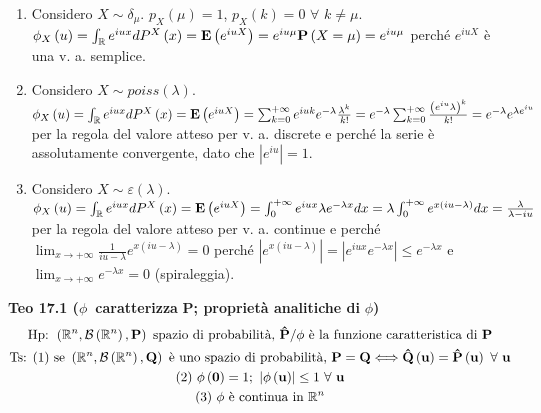 \documentclass{article}
\begin{document}
\begin{enumerate}
\item Considero $X\sim \delta _{\mu }$. $p_{X}\left( \mu \right) =1$, $%
p_{X}\left( k\right) =0$ $\forall $ $k\neq \mu $. $\phi _{X}\left( u\right)
=\int_{%
\mathbb{R}
}e^{iux}dP^{X}\left( x\right) =\mathbf{E}\left( e^{iuX}\right) =e^{iu\mu }%
\mathbf{P}\left( X=\mu \right) =e^{iu\mu }$ perch\'{e} $e^{iuX}$ \`{e} una
v. a. semplice.

\item Considero $X\sim poiss\left( \lambda \right) $. $\phi _{X}\left(
u\right) =\int_{%
\mathbb{R}
}e^{iux}dP^{X}\left( x\right) =\mathbf{E}\left( e^{iuX}\right)
=\sum_{k=0}^{+\infty }e^{iuk}e^{-\lambda }\frac{\lambda ^{k}}{k!}%
=e^{-\lambda }\sum_{k=0}^{+\infty }\frac{\left( e^{iu}\lambda \right) ^{k}}{%
k!}=e^{-\lambda }e^{\lambda e^{iu}}$ per la regola del valore atteso per v.
a. discrete e perch\'{e} la serie \`{e} assolutamente convergente, dato che $%
\left\vert e^{iu}\right\vert =1$.

\item Considero $X\sim \varepsilon \left( \lambda \right) $. $\phi
_{X}\left( u\right) =\int_{%
\mathbb{R}
}e^{iux}dP^{X}\left( x\right) =\mathbf{E}\left( e^{iuX}\right)
=\int_{0}^{+\infty }e^{iux}\lambda e^{-\lambda x}dx=\lambda
\int_{0}^{+\infty }e^{x\left( iu-\lambda \right) }dx=\frac{\lambda }{\lambda
-iu}$ per la regola del valore atteso per v. a. continue e perch\'{e} $%
\lim_{x\rightarrow +\infty }\frac{1}{iu-\lambda }e^{x\left( iu-\lambda
\right) }=0$ perch\'{e} $\left\vert e^{x\left( iu-\lambda \right)
}\right\vert =\left\vert e^{iux}e^{-\lambda x}\right\vert \leq e^{-\lambda
x} $ e $\lim_{x\rightarrow +\infty }e^{-\lambda x}=0$ (spiraleggia).
\end{enumerate}

\textbf{Teo 17.1 (}$\phi $\textbf{\ caratterizza }$\mathbf{P}$\textbf{;
propriet\`{a} analitiche di }$\phi $\textbf{)}%
\begin{gather*}
\text{Hp: }\left( 
\mathbb{R}
^{n},\mathcal{B}\left( 
\mathbb{R}
^{n}\right) ,\mathbf{P}\right) \text{ spazio di probabilit\`{a}, }\mathbf{%
\hat{P}}/\phi \text{ \`{e} la funzione caratteristica di }\mathbf{P} \\
\text{Ts: (1) se }\left( 
\mathbb{R}
^{n},\mathcal{B}\left( 
\mathbb{R}
^{n}\right) ,\mathbf{Q}\right) \text{ \`{e} uno spazio di probabilit\`{a}, }%
\mathbf{P=Q\Longleftrightarrow \hat{Q}}\left( \mathbf{u}\right) =\mathbf{%
\hat{P}}\left( \mathbf{u}\right) \text{ }\forall \text{ }\mathbf{u} \\
\text{(2) }\phi \left( \mathbf{0}\right) =1\text{; }\left\vert \phi \left( 
\mathbf{u}\right) \right\vert \leq 1\text{ }\forall \text{ }\mathbf{u} \\
\text{(3) }\phi \text{ \`{e} continua in }\mathbf{%
\mathbb{R}
}^{n}
\end{gather*}
\end{document}
